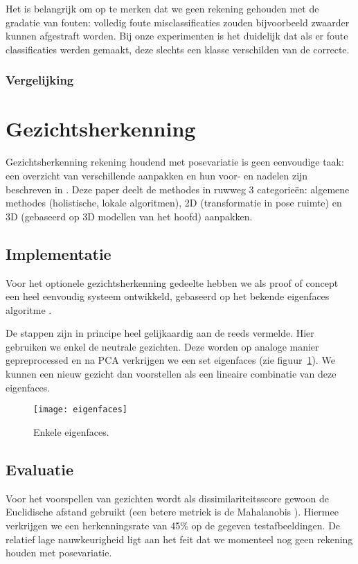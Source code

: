 \documentclass[a4paper,dutch,11pt,]{scrartcl}
\begin{document}
Het is belangrijk om op te merken dat we geen rekening gehouden met de gradatie van fouten: volledig foute misclassificaties zouden bijvoorbeeld zwaarder kunnen afgestraft worden. Bij onze experimenten is het duidelijk dat als er foute classificaties werden gemaakt, deze slechts een klasse verschilden van de correcte.


\subsubsection{Vergelijking}


\section{Gezichtsherkenning}
Gezichtsherkenning rekening houdend met posevariatie is geen eenvoudige taak: een overzicht van verschillende aanpakken en hun voor- en nadelen zijn beschreven in \cite{facerec}. Deze paper deelt de methodes in ruwweg 3 categorie\"en: algemene methodes (holistische, lokale algoritmen), 2D (transformatie in pose ruimte) en 3D (gebaseerd op 3D modellen van het hoofd) aanpakken.

\subsection{Implementatie}
Voor het optionele gezichtsherkenning gedeelte hebben we als proof of concept een heel eenvoudig systeem ontwikkeld, gebaseerd op het bekende eigenfaces algoritme \cite{eigenface}.

De stappen zijn in principe heel gelijkaardig aan de reeds vermelde. Hier gebruiken we enkel de neutrale gezichten. Deze worden op analoge manier gepreprocessed en na PCA verkrijgen we een set eigenfaces (zie figuur~\ref{fig:eigenfaces}). We kunnen een nieuw gezicht dan voorstellen als een lineaire combinatie van deze eigenfaces.

\begin{figure}[hbpt]
\centering
 \texttt{[image: eigenfaces]}
 \caption{Enkele eigenfaces.}
\label{fig:eigenfaces}
\end{figure}

\subsection{Evaluatie}
Voor het voorspellen van gezichten wordt als dissimilariteitsscore gewoon de Euclidische afstand gebruikt (een betere metriek is de Mahalanobis \cite{stat}). Hiermee verkrijgen we een herkenningsrate van 45\% op de gegeven testafbeeldingen. De relatief lage nauwkeurigheid ligt aan het feit dat we momenteel nog geen rekening houden met posevariatie.
\end{document}
